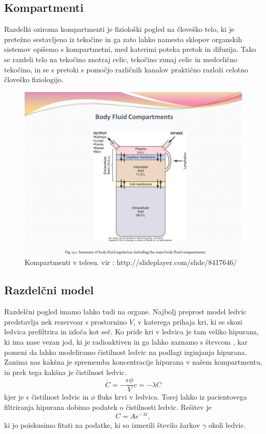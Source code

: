 \documentclass[11pt, a4paper]{article}
\begin{document}
\subsection{Kompartmenti}
Razdelki oziroma kompartmenti je fiziološki pogled na človeško telo, ki je pretežno sestavljeno iz tekočine in ga zato lahko namesto sklopov organskih sistemov opišemo s kompartmetni, med katerimi poteka pretok in difuzija. Tako se razdeli telo na tekočino znotraj celic, tekočino zunaj celic in medcelično tekočino, in se s pretoki s pomočjo različnih kanalov praktično razloži celotno človeško fiziologijo.\newline\newline

 \begin{figure}[H]
   
  \includegraphics[width=16cm]{compartment.jpg}
 \caption{Kompartmenti v telesu. vir : http://slideplayer.com/slide/8417646/}
\end{figure}

\subsection{Razdelčni model }
Razdelčni pogled imamo lahko tudi na organe. Najbolj preprost model ledvic predstavlja nek rezervoar s prostornino $V$, v katerega prihaja kri, ki se skozi ledvica prefiltrira in izloča kot seč. Ko pride kri v ledvica je tam veliko hipurana, ki ima nase vezan jod, ki je radioaktiven in ga lahko zaznamo s števcom , kar pomeni da lahko modeliramo čistilnost ledvic na podlagi izginjanja hipurana. Zanima nas kakšna je sprememba koncentracije hipurana v našem kompartmentu, in prek tega kakšna je čistilnost ledvic.
\begin{equation}
\dot{C} = - \frac{\epsilon \phi}{V} c = -\lambda C
\end{equation}
kjer je $\epsilon$ čistilnost ledvic in $\phi$ fluks krvi v ledvica. Torej lahko iz pacientovega filtriranja hipurana dobimo podatek o čistilnosti ledvic. \newline \newline
Rešitev je 
\begin{equation}
C = A e^{-\lambda t},
\end{equation}
ki jo poiskusimo fitati na podatke, ki so izmerili število žarkov $\gamma$ okoli ledvic.
\end{document}
